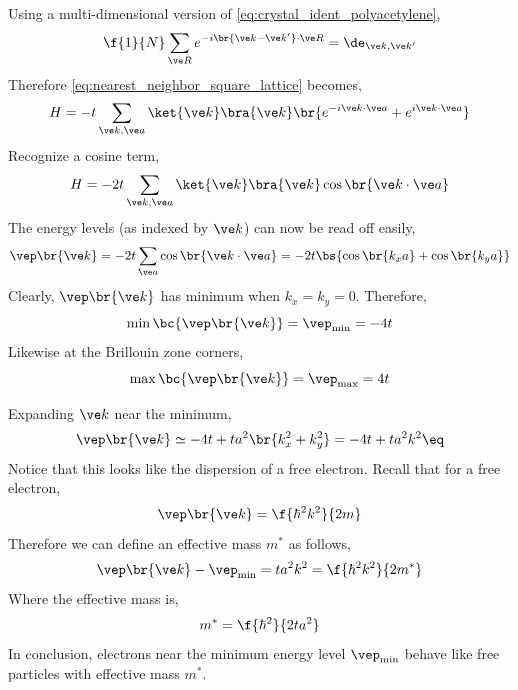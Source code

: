 \documentclass{article}
\begin{document}
Using a multi-dimensional version of \cref{eq:crystal_ident_polyacetylene},
\[ \f{1}{N} \sum_{\ve R} e^{- i \br{\ve k - \ve k'} \cdot \ve R} = \de_{\ve k, \ve k'} \]
Therefore \cref{eq:nearest_neighbor_square_lattice} becomes,
\[ H = - t \sum_{\ve k, \ve a} \ket{\ve k} \bra{\ve k} \br{e^{- i\ve k \cdot \ve a} + e^{i\ve k \cdot \ve a}} \]
Recognize a cosine term,
\[ H = - 2t \sum_{\ve k, \ve a} \ket{\ve k} \bra{\ve k} \cos \br{\ve k \cdot \ve a} \]
The energy levels (as indexed by $\ve k$) can now be read off easily,
\[ \vep \br{\ve k} = -2 t \sum_{\ve a} \cos \br{\ve k \cdot \ve a} = - 2t \bs{ \cos \br{k_x a} + \cos \br{k_y a}} \]
Clearly, $\vep\br{\ve k}$ has minimum when $k_x = k_y = 0$. Therefore,
\[ \min\bc{\vep\br{\ve k}} = \vep_{\min} = - 4 t \]
Likewise at the Brillouin zone corners,
\[ \max\bc{\vep\br{\ve k}} = \vep_{\max} = 4 t \]
\begin{center}
\end{center}
Expanding $\ve k$ near the minimum,
\[ \vep\br{\ve k} \simeq -4t + t a^2 \br{k_x^2 + k_y^2} = -4t + ta^2 k^2 \eq \label{eq:minimum_k}\]
Notice that this looks like the dispersion of a free electron.
Recall that for a free electron,
\[ \vep \br{\ve k} = \f{\hbar^2 k^2}{2 m} \]
Therefore we can define an effective mass $m^{*}$ as follows,
\[ \vep \br{\ve k} - \vep_{\min} = ta^2 k^2 = \f{\hbar^2 k^2}{2 m^{*}} \]
Where the effective mass is,
\[ m^{*} = \f{\hbar^2}{2 t a^2} \]
In conclusion, electrons near the minimum energy level $\vep_{\min}$ behave like free particles with effective mass $m^{*}$. \\
\end{document}
